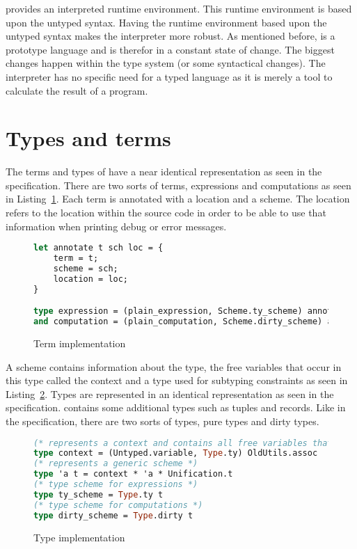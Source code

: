 \eff provides an interpreted runtime environment. This runtime environment is based upon the untyped syntax. Having the runtime environment based upon the untyped syntax makes the interpreter more robust. As mentioned before, \eff is a prototype language and is therefor in a constant state of change. The biggest changes happen within the type system (or some syntactical changes). The interpreter has no specific need for a typed language as it is merely a tool to calculate the result of a program.  

\section{Types and terms}
The terms and types of \core have a near identical representation as seen in the specification. There are two sorts of terms, expressions and computations as seen in Listing~\ref{lst:expression}. Each term is annotated with a location and a scheme. The location refers to the location within the source code in order to be able to use that information when printing debug or error messages.

\begin{figure}
\caption{Term implementation}
\label{lst:expression}
\begin{lstlisting}[language=Caml]
let annotate t sch loc = {
    term = t;
    scheme = sch;
    location = loc;
}

type expression = (plain_expression, Scheme.ty_scheme) annotation
and computation = (plain_computation, Scheme.dirty_scheme) annotation  
\end{lstlisting}
\end{figure}

A scheme contains information about the type, the free variables that occur in this type called the context and a type used for subtyping constraints as seen in Listing~\ref{lst:scheme}. Types are represented in an identical representation as seen in the specification. \eff contains some additional types such as tuples and records. Like in the specification, there are two sorts of types, pure types and dirty types. 

\begin{figure}
\caption{Type implementation}
\label{lst:scheme}
\begin{lstlisting}[language=Caml]
(* represents a context and contains all free variables that occur *)
type context = (Untyped.variable, Type.ty) OldUtils.assoc
(* represents a generic scheme *)
type 'a t = context * 'a * Unification.t
(* type scheme for expressions *)
type ty_scheme = Type.ty t
(* type scheme for computations *)
type dirty_scheme = Type.dirty t
\end{lstlisting}
\end{figure}


